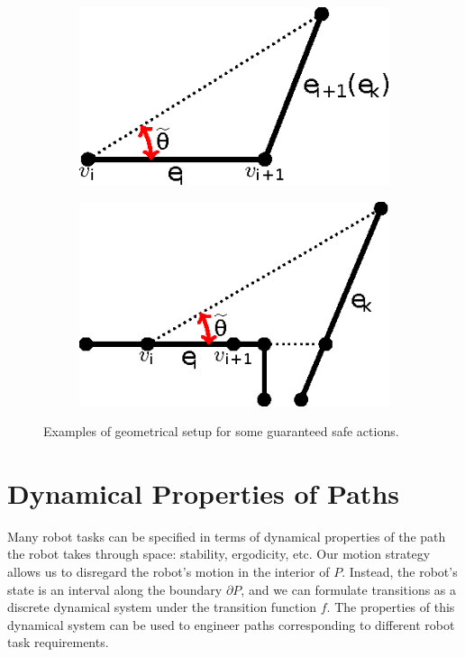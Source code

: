 \documentclass[sageh,times,Review]{sagej}
\begin{document}
\begin{figure}
\centering
\begin{subfigure}{0.5\columnwidth}
\centering
\includegraphics[width=0.9\columnwidth]{tikz2.eps}
\end{subfigure}%
\begin{subfigure}{0.5\columnwidth}
\centering
\includegraphics[width=0.9\columnwidth]{tikz3.eps}
\end{subfigure}
\caption{Examples of geometrical setup for some guaranteed safe actions.}
\label{fig:two_safe_cases}
\end{figure}


\section{Dynamical Properties of Paths} \label{secdyn}


Many robot tasks can be specified in terms of dynamical properties of
the path the robot takes through space: stability, ergodicity, etc.
Our motion strategy allows us to disregard the robot's motion in the interior of
$P$. Instead, the robot's state is an interval 
along the boundary $\partial P$, and we can formulate transitions as a discrete
dynamical system under the transition function $f$. The properties of this
dynamical system can be used to engineer paths corresponding to different robot
task requirements.
\end{document}
